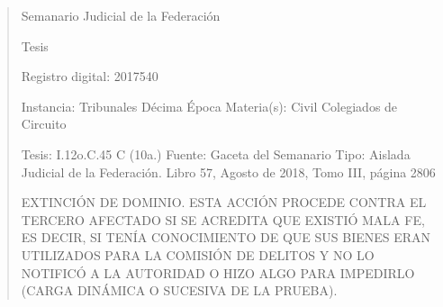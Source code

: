 \documentclass[11pt,a4paper]{article}
\begin{document}
\begin{quote}
                                                   Semanario Judicial de la Federación

                                               Tesis

 Registro digital: 2017540

 Instancia: Tribunales             Décima Época                          Materia(s): Civil
 Colegiados de Circuito

 Tesis: I.12o.C.45 C (10a.)        Fuente: Gaceta del Semanario        Tipo: Aislada
                                   Judicial de la Federación.
                                   Libro 57, Agosto de 2018, Tomo III,
                                   página 2806


EXTINCIÓN DE DOMINIO. ESTA ACCIÓN PROCEDE CONTRA EL TERCERO AFECTADO SI SE
ACREDITA QUE EXISTIÓ MALA FE, ES DECIR, SI TENÍA CONOCIMIENTO DE QUE SUS
BIENES ERAN UTILIZADOS PARA LA COMISIÓN DE DELITOS Y NO LO NOTIFICÓ A LA
AUTORIDAD O HIZO ALGO PARA IMPEDIRLO (CARGA DINÁMICA O SUCESIVA DE LA
PRUEBA).



\end{quote}
\end{document}

